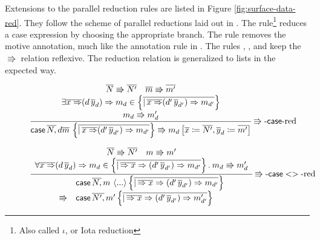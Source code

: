
Extensions to the parallel reduction rules are listed in Figure \ref{fig:surface-data-red}.
They follow the scheme of parallel reductions laid out in .
The  rule\footnote{Also called $\iota$, or Iota reduction} reduces a case expression by choosing the appropriate branch.
The  rule removes the motive annotation, much like the annotation rule in .
The rules , , and  keep the $\Rrightarrow$ relation reflexive.
The reduction relation is generalized to lists in the expected way.

\begin{figure}
\[
\frac{\begin{array}{c}
\overline{N}\Rrightarrow\overline{N'}\quad\overline{m}\Rrightarrow\overline{m'}\\
\exists\overline{x\Rightarrow}(d\,\overline{y}_{d})\Rightarrow m_{d}\in\left\{ \overline{|\,\overline{x\Rightarrow}(d'\,\overline{y}_{d'})\Rightarrow m_{d'}}\right\} \\
m_{d}\Rrightarrow m_{d}'
\end{array}}{\mathsf{case}\,\overline{N,}\,d\overline{m}\,\left\{ \overline{|\,\overline{x\Rightarrow}(d'\,\overline{y}_{d'})\Rightarrow m_{d'}}\right\} \Rrightarrow m_{d}\left[\overline{x}\coloneqq\overline{N'},\overline{y}_{d}\coloneqq\overline{m'}\right]
} \operatorname{\Rrightarrow-\mathsf{case}{}-red} 
\]

\[
\frac{\begin{array}{c}
\overline{N}\Rrightarrow\overline{N'}\quad m\Rrightarrow m'\\
\forall\overline{x\Rightarrow}(d\,\overline{y}_{d})\Rightarrow m_{d}\in\left\{ \overline{|\,\overline{\Rightarrow x}\Rightarrow(d'\,\overline{y}_{d'})\Rightarrow m_{d'}}\right\} .\:m_{d}\Rrightarrow m_{d}'
\end{array}}{
  \begin{array}{rl}
               & \mathsf{case}\,\overline{N,}\,m\,\left\langle ...\right\rangle \left\{ \overline{|\,\overline{\Rightarrow x}\Rightarrow(d'\,\overline{y}_{d'})\Rightarrow m_{d'}}\right\} \\
  \Rrightarrow & \mathsf{case}\,\overline{N',}\,m'\left\{ \overline{|\,\overline{\Rightarrow x}\Rightarrow(d'\,\overline{y}_{d'})\Rightarrow m_{d'}'}\right\} 
\end{array}
  } \operatorname{\Rrightarrow-\mathsf{case}{}<>-red} 
\]


\end{figure}
